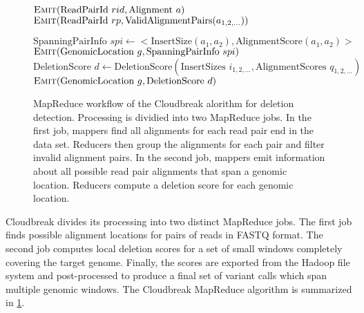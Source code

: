 \documentclass[12pt]{article}
\begin{document}
\begin{figure}[p]
\algrenewcommand{}
  \begin{algorithmic}[1]
    \State $\textsc{Emit}(\textrm{ReadPairId }rid, \textrm{Alignment }a)$
    \EndFor
    \EndFunction
    \State $\textsc{Emit}(\textrm{ReadPairId }rp, \textrm{ValidAlignmentPairs}(a_{1,2,\ldots}))$
    \EndFunction
    \EndProcedure

    \State $ \textrm{SpanningPairInfo }spi \gets <\textrm{InsertSize}(a_1,a_2), \textrm{AlignmentScore}(a_1,a_2)>$
    \State $\textsc{Emit}(\textrm{GenomicLocation }g, \textrm{SpanningPairInfo }spi)$
    \EndFor
    \EndFor
    \EndFunction
    \State $\textrm{DeletionScore } d \gets \textrm{DeletionScore}(\textrm{InsertSizes }i_{1,2,\ldots}, \textrm{AlignmentScores }q_{1,2,\ldots})$
    \State $\textsc{Emit}(\textrm{GenomicLocation }g, \textrm{DeletionScore } d)$
    \EndFunction
    \EndProcedure
  \end{algorithmic}
  \caption{MapReduce workflow of the Cloudbreak alorithm for deletion detection. Processing is dividied into two MapReduce jobs. In the first job, mappers find all alignments for each read pair end in the data set. Reducers then group the alignments for each pair and filter invalid alignment pairs. In the second job, mappers emit information about all possible read pair alignments that span a genomic location. Reducers compute a deletion score for each genomic location.}
\label{algo1}
\end{figure}

Cloudbreak divides its processing into two distinct MapReduce jobs. The first job finds possible alignment locations for pairs of reads in FASTQ format. The second job computes local deletion scores for a set of small windows completely covering the target genome. Finally, the scores are exported from the Hadoop file system and post-processed to produce a final set of variant calls which span multiple genomic windows. The Cloudbreak MapReduce algorithm is summarized in \ref{algo1}.
\end{document}
